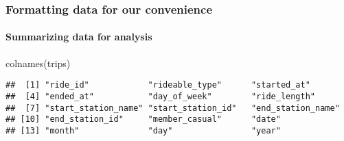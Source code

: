 \documentclass[
]{article}
\newenvironment{Shaded}{\begin{snugshade}}{\end{snugshade}}
\newcommand{\FunctionTok}[1]{\textcolor[rgb]{0.00,0.00,0.00}{#1}}
\newcommand{\NormalTok}[1]{#1}
\newcommand{\OtherTok}[1]{\textcolor[rgb]{0.56,0.35,0.01}{#1}}
\newcommand{\SpecialCharTok}[1]{\textcolor[rgb]{0.00,0.00,0.00}{#1}}
\newcommand{\StringTok}[1]{\textcolor[rgb]{0.31,0.60,0.02}{#1}}
\begin{document}
\hypertarget{formatting-data-for-our-convenience}{%
\subsubsection{Formatting data for our
convenience}\label{formatting-data-for-our-convenience}}

\begin{Shaded}
\end{Shaded}

\hypertarget{summarizing-data-for-analysis}{%
\paragraph{Summarizing data for
analysis}\label{summarizing-data-for-analysis}}

\begin{Shaded}
\begin{Highlighting}[]
\FunctionTok{colnames}\NormalTok{(trips)}
\end{Highlighting}
\end{Shaded}

\begin{verbatim}
##  [1] "ride_id"            "rideable_type"      "started_at"        
##  [4] "ended_at"           "day_of_week"        "ride_length"       
##  [7] "start_station_name" "start_station_id"   "end_station_name"  
## [10] "end_station_id"     "member_casual"      "date"              
## [13] "month"              "day"                "year"
\end{verbatim}
\end{document}
